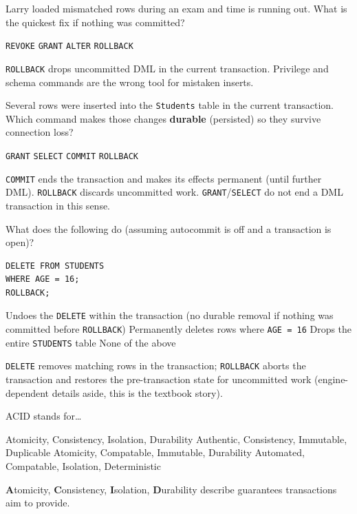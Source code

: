 \question[4]
Larry loaded mismatched rows during an exam and time is running out. What is the quickest fix if nothing was committed?
\begin{choices}
  \choice \texttt{REVOKE}
  \choice \texttt{GRANT}
  \choice \texttt{ALTER}
  \CorrectChoice \texttt{ROLLBACK}
\end{choices}
\begin{solution}
  \texttt{ROLLBACK} drops uncommitted DML in the current transaction. Privilege and schema commands are the wrong tool for mistaken inserts.
\end{solution}

\newpage 


\question[4]
Several rows were inserted into the \texttt{Students} table in the current transaction. Which command makes those changes \textbf{durable} (persisted) so they survive connection loss?
\begin{choices}
  \choice \texttt{GRANT}
  \choice \texttt{SELECT}
  \CorrectChoice \texttt{COMMIT}
  \choice \texttt{ROLLBACK}
\end{choices}
\begin{solution}
  \texttt{COMMIT} ends the transaction and makes its effects permanent (until further DML). \texttt{ROLLBACK} discards uncommitted work. \texttt{GRANT}/\texttt{SELECT} do not end a DML transaction in this sense.
\end{solution}

\question[4]
What does the following do (assuming autocommit is off and a transaction is open)?
\begin{lstlisting}[style=sql]
DELETE FROM STUDENTS
WHERE AGE = 16;
ROLLBACK;
\end{lstlisting}
\begin{choices}
  \CorrectChoice Undoes the \texttt{DELETE} within the transaction (no durable removal if nothing was committed before \texttt{ROLLBACK})
  \choice Permanently deletes rows where \texttt{AGE = 16}
  \choice Drops the entire \texttt{STUDENTS} table
  \choice None of the above
\end{choices}
\begin{solution}
  \texttt{DELETE} removes matching rows in the transaction; \texttt{ROLLBACK} aborts the transaction and restores the pre-transaction state for uncommitted work (engine-dependent details aside, this is the textbook story).
\end{solution}

\question[4]
ACID stands for\ldots
\begin{choices}
  \CorrectChoice Atomicity, Consistency, Isolation, Durability
  \choice Authentic, Consistency, Immutable, Duplicable
  \choice Atomicity, Compatable, Immutable, Durability
  \choice Automated, Compatable, Isolation, Deterministic
\end{choices}
\begin{solution}
  \textbf{A}tomicity, \textbf{C}onsistency, \textbf{I}solation, \textbf{D}urability describe guarantees transactions aim to provide.
\end{solution}

